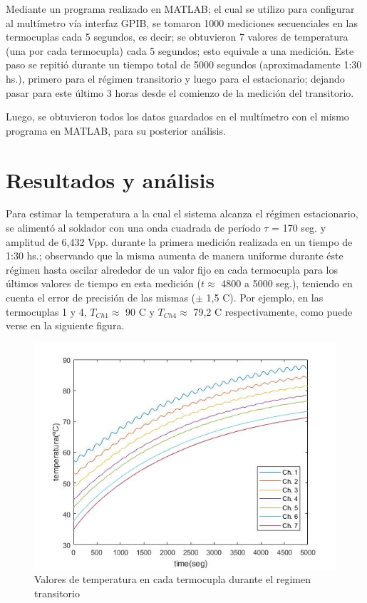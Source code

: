 \documentclass[twoside,twocolumn,a4paper]{article}
\begin{document}
Mediante un programa realizado en MATLAB; el cual se utilizo para configurar al mult\'imetro v\'ia interfaz GPIB, se tomaron 1000 mediciones secuenciales en las termocuplas cada 5 segundos, es decir; se obtuvieron 7 valores de temperatura (una por cada termocupla) cada 5 segundos; esto equivale a una medici\'on. Este paso se repiti\'o durante un tiempo total de 5000 segundos (aproximadamente 1:30 hs.), primero para el r\'egimen transitorio y luego para el estacionario; dejando pasar para este \'ultimo 3 horas desde el comienzo de la medici\'on del transitorio. \newline

\par
Luego, se obtuvieron todos los datos guardados en el mult\'imetro con el mismo programa en MATLAB, para su posterior an\'alisis.

\section{Resultados y an\'alisis}

Para estimar la temperatura a la cual el sistema alcanza el r\'egimen estacionario, se aliment\'o al soldador con una onda cuadrada de per\'iodo $\tau$ = 170 seg. y amplitud de 6,432 Vpp. durante la primera medici\'on realizada en un tiempo de 1:30 hs.; observando que la misma aumenta de manera uniforme durante \'este r\'egimen hasta oscilar alrededor de un valor fijo en cada termocupla para los \'ultimos valores de tiempo en esta medici\'on ($t \approx$ 4800 a 5000 seg.), teniendo en cuenta el error de precisi\'on de las mismas ($\pm$ 1,5 \degree C). Por ejemplo, en las termocuplas 1 y 4, $T_{Ch 1} \approx$  90 \degree C y $T_{Ch 4} \approx$ 79,2 \degree C respectivamente, como puede verse en la siguiente figura.

\begin{figure}[H]
\includegraphics[width=\linewidth]{Tvst_transitorio.jpg}
\caption{Valores de temperatura en cada termocupla durante el regimen transitorio}
\label{fig:Tvst_transitorio}
\end{figure}
\end{document}
